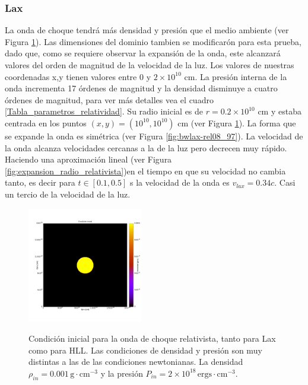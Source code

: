 \documentclass[12pt,a4paper]{book}
\begin{document}
\subsubsection{Lax}
La onda de choque tendrá más densidad y presión que el medio ambiente (ver Figura \ref{fig:Lax-relativista}). Las dimensiones del dominio tambien se modificarón para esta prueba, dado que, como se requiere observar la expansión de la onda, este alcanzará valores del orden de magnitud de la velocidad de la luz. Los valores de nuestras coordenadas x,y tienen valores entre $0$ y $2 \times 10^{10}$ cm. La presión interna de la onda incrementa 17 órdenes de magnitud y la densidad disminuye a cuatro órdenes de magnitud, para ver más detalles vea el cuadro \ref{Tabla_parametros_relatividad}.  Su radio inicial es de  $r = 0.2 \times 10^{10}$ cm y estaba centrada en los puntos $(x,y) = (10^{10}, 10^{10})$ cm (ver Figura \ref{fig:Lax-relativista}). La forma que se expande la onda es simétrica (ver Figura \ref{fig:bwlax-rel08_97}). La velocidad de la onda alcanza velocidades cercanas a la de la luz pero decrecen muy rápido. Haciendo una aproximación lineal (ver Figura \ref{fig:expansion_radio_relativista})en el tiempo en que su velocidad no cambia tanto, es decir para $t \in [0.1, 0.5]$ s la velocidad de la onda es $v_{lax} = 0.34c$. Casi un tercio de la velocidad de la luz.

\begin{figure}
\centering
{\includegraphics[width=0.45\textwidth]{./Figuras/Pruebas/Prueba_onda_choque/Lax-HLL-rel/bwlax-rel00}}
\caption{\label{fig:Lax-relativista}Condición inicial para la onda de choque relativista, tanto para Lax como para HLL. Las condiciones de densidad y presión son muy distintas a las de las condiciones newtonianas. La densidad $\rho_{in} = 0.001 \, \mathrm{g} \cdot \mathrm{cm}^{-3}$ y la presión $P_{in} = 2 \times 10^{18} \, \mathrm{ergs} \cdot \mathrm{cm}^{-3}$.}
\end{figure}
\end{document}
